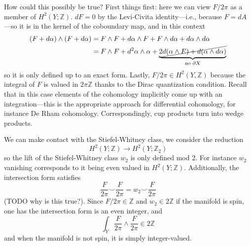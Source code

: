 \documentclass{report}
\begin{document}
How could this possibly be true? First things first: here we can view 
$ F /2\pi $ as a member of $ H^2(Y;\mathbb{Z}) $. $ dF = 0 $ by the Levi-Civita 
identity---i.e., because $ F = dA $---so it is in the kernel of the coboundary 
map, and in this context 
\begin{align*}
	(F+ d\alpha)\wedge (F+ d\alpha)
		&= F\wedge F 
			+ d\alpha \wedge F + F\wedge d\alpha
			+ d\alpha\wedge d\alpha\\
		&= F\wedge F + d^2\alpha \wedge \alpha 
			+ \underbrace{\cancel{2 d(\alpha \wedge F) + d(\alpha \wedge d\alpha)}}_{\text{no }\partial X}
\end{align*}
so it is only defined up to an exact form. Lastly, $ F/2\pi \in H^2(Y, \mathbb{Z}) $
because the integral of $ F $  is valued in $ 2\pi \mathbb{Z} $ thanks to the 
Dirac quantization condition. Recall that in this case elements of the
cohomology implicitly come up with an integration---this is the appropriate
approach for differential cohomology, for instance De Rham cohomology.
Correspondingly, cup products turn into wedge products.

We can make contact with the Stiefel-Whitney class, we consider the reduction
\begin{equation*}
	H^2(Y;\mathbb{Z}) \to H^2(Y;\mathbb{Z}_2)
\end{equation*}
so the lift of the Stiefel-Whitney class $ w_2 $ is only defined mod 2. For 
instance $ w_2 $ vanishing corresponds to it being even valued in $
H^2(Y;\mathbb{Z}) $. Additionally, the intersection form satisfies 
\begin{equation*}
	\frac{F}{2\pi}\smallsmile \frac{F}{2\pi} = w_2 \smallsmile \frac{F}{2\pi}
\end{equation*}
(TODO why is this true?). Since $ F/2\pi\in\mathbb{Z} $ and $ w_2 \in 2\mathbb{Z}$ 
if the manifold is spin, one has the intersection form is an even integer, and 
\begin{equation*}
	\int_Y \frac{F}{2\pi} \wedge \frac{F}{2\pi} \in 2\mathbb{Z}
\end{equation*}
and when the manifold is not spin, it is simply integer-valued.
\end{document}
